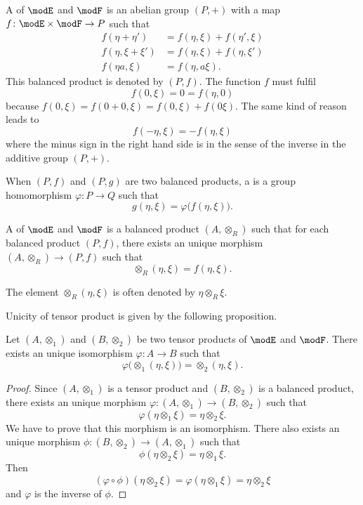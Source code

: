 A  of $\modE$ and $\modF$ is an abelian group $(P,+)$ with a map $f\colon \modE\times\modF\to P$ such that 
\begin{subequations}
\begin{align}
  f(\eta+\eta')&=f(\eta,\xi)+f(\eta',\xi)\\
f(\eta,\xi+\xi')&=f(\eta,\xi)+f(\eta,\xi')\\
f(\eta a,\xi)&=f(\eta,a\xi).
\end{align}
\end{subequations}
This balanced product is denoted by $(P,f)$. The function $f$ must fulfil
\[ 
  f(0,\xi)=0=f(\eta,0)
\]
because $f(0,\xi)=f(0+0,\xi)=f(0,\xi)+f(0\xi)$. The same kind of reason leads to
\[ 
  f(-\eta,\xi)=-f(\eta,\xi)
\]
where the minus sign in the right hand side is in the sense of the inverse in the additive group $(P,+)$.

When $(P,f)$ and $(P,g)$ are two balanced products, a  is a group homomorphism $\varphi\colon P\to Q$ such that
\[ 
  g(\eta,\xi)=\varphi\big( f(\eta,\xi) \big).
\]

\begin{definition}
A  of $\modE$ and $\modF$ is a balanced product $(A,\otimes_R)$ such that for each balanced product $(P,f)$, there exists an unique morphism $(A,\otimes_R)\to(P,f)$ such that
\[ 
  \otimes_R(\eta,\xi)=f(\eta,\xi).
\]

\end{definition}
The element $\otimes_R(\eta,\xi)$ is often denoted by $\eta\otimes_R\xi$.

Unicity of tensor product is given by the following proposition.

\begin{proposition}
Let $(A,\otimes_1)$ and $(B,\otimes_2)$ be two tensor products of $\modE$ and $\modF$. There exists an unique isomorphism $\varphi\colon A\to B$ such that
\[ 
  \varphi\big( \otimes_1(\eta,\xi) \big)=\otimes_2(\eta,\xi).
\]

\end{proposition}

\begin{proof}
Since $(A,\otimes_1)$ is a tensor product and $(B,\otimes_2)$ is a balanced product, there exists an unique morphism $\varphi\colon (A,\otimes_1)\to (B,\otimes_2)$ such that
\[ 
  \varphi(\eta\otimes_1\xi)=\eta\otimes_2\xi.
\]
We have to prove that this morphism is an isomorphism. There also exists an unique morphism $\phi\colon (B,\otimes_2)\to (A,\otimes_1)$ such that
\[ 
  \phi(\eta\otimes_2\xi)=\eta\otimes_1\xi.
\]
Then
\[ 
   (\varphi\circ\phi)(\eta\otimes_2\xi)=\varphi(\eta\otimes_1\xi)=\eta\otimes_2\xi  
\]
and $\varphi$ is the inverse of $\phi$.
\end{proof}

